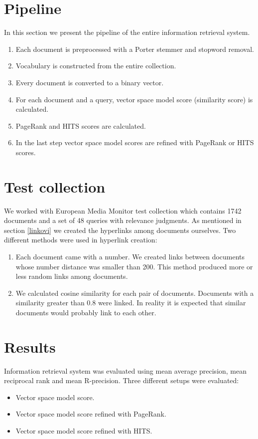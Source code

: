 \documentclass[10pt, a4paper]{article}
\begin{document}
\section{Pipeline}
In this section we present the pipeline of the entire information retrieval system.

\begin{enumerate}
\item Each document is preprocessed with a Porter stemmer and stopword removal.
\item Vocabulary is constructed from the entire collection.
\item Every document is converted to a binary vector.
\item For each document and a query, vector space model score (similarity score) is calculated.
\item PageRank and HITS scores are calculated.
\item In the last step vector space model scores are refined with PageRank or HITS scores.
\end{enumerate}


\section{Test collection}
We worked with European Media Monitor test collection which contains 1742 documents and a set of 48 queries with relevance judgments. As mentioned in section \ref{linkovi} we created the hyperlinks among documents ourselves. Two different methods were used in hyperlink creation:
\begin{enumerate}
\item Each document came with a number. We created links between documents whose number distance was smaller than 200. This method produced more or less random links among documents.
\item We calculated cosine similarity for each pair of documents. Documents with a similarity greater than 0.8 were linked. In reality it is expected that similar documents would probably link to each other.
\end{enumerate}

\section{Results}
Information retrieval system was evaluated using mean average precision, mean reciprocal rank and mean R-precision. Three different setups were evaluated:
\begin{itemize}
\item Vector space model score.
\item Vector space model score refined with PageRank.
\item Vector space model score refined with HITS.
\end{itemize}
\end{document}
